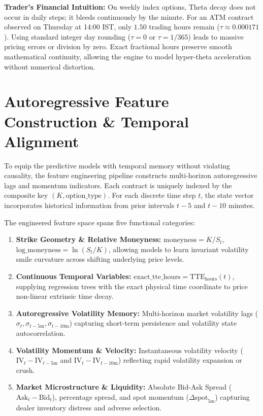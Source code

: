 \noindent
\textbf{Trader's Financial Intuition:}
On weekly index options, Theta decay does not occur in daily steps; it bleeds continuously by the minute. For an ATM contract observed on Thursday at 14:00 IST, only $1.50$ trading hours remain ($\tau \approx 0.000171$). Using standard integer day rounding ($\tau = 0$ or $\tau = 1/365$) leads to massive pricing errors or division by zero. Exact fractional hours preserve smooth mathematical continuity, allowing the engine to model hyper-theta acceleration without numerical distortion.

\section{Autoregressive Feature Construction \& Temporal Alignment}
\label{sec:autoregressive_features}

To equip the predictive models with temporal memory without violating causality, the feature engineering pipeline constructs multi-horizon autoregressive lags and momentum indicators. Each contract is uniquely indexed by the composite key $(K, \text{option\_type})$. For each discrete time step $t$, the state vector incorporates historical information from prior intervals $t-5$ and $t-10$ minutes.

The engineered feature space spans five functional categories:
\begin{enumerate}\setlength{\itemsep}{2pt}\setlength{\parskip}{0pt}
    \item \textbf{Strike Geometry \& Relative Moneyness:} $\text{moneyness} = K / S_t$, $\text{log\_moneyness} = \ln(S_t / K)$, allowing models to learn invariant volatility smile curvature across shifting underlying price levels.
    \item \textbf{Continuous Temporal Variables:} $\text{exact\_tte\_hours} = \text{TTE}_{\text{hours}}(t)$, supplying regression trees with the exact physical time coordinate to price non-linear extrinsic time decay.
    \item \textbf{Autoregressive Volatility Memory:} Multi-horizon market volatility lags ($\sigma_t, \sigma_{t-5\text{m}}, \sigma_{t-10\text{m}}$) capturing short-term persistence and volatility state autocorrelation.
    \item \textbf{Volatility Momentum \& Velocity:} Instantaneous volatility velocity ($\text{IV}_t - \text{IV}_{t-5\text{m}}$ and $\text{IV}_t - \text{IV}_{t-10\text{m}}$) reflecting rapid volatility expansion or crush.
    \item \textbf{Market Microstructure \& Liquidity:} Absolute Bid-Ask Spread ($\text{Ask}_t - \text{Bid}_t$), percentage spread, and spot momentum ($\Delta \text{spot}_{5\text{m}}$) capturing dealer inventory distress and adverse selection.
\end{enumerate}

